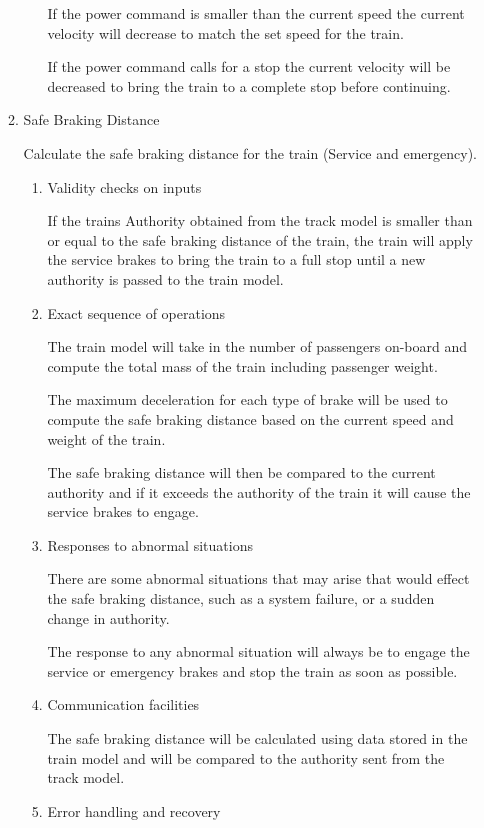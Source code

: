 \documentclass[11pt]{article}
\begin{document}
\begin{enumerate}
\begin{enumerate}
\begin{enumerate}
If the power command is smaller than the current speed the current velocity will decrease to match the set speed for the train.

If the power command calls for a stop the current velocity will be decreased to bring the train to a complete stop before continuing.
\end{enumerate}

\item Safe Braking Distance
\label{sec-3-1-4-1-3}

Calculate the safe braking distance for the train (Service and emergency). 
\begin{enumerate}
\item Validity checks on inputs
\label{sec-3-1-4-1-3-1}

If the trains Authority obtained from the track model is smaller than or equal to the safe braking distance of the train, the train will apply the service brakes to bring the train to a full stop until a new authority is passed to the train model.
\item Exact sequence of operations
\label{sec-3-1-4-1-3-2}

The train model will take in the number of passengers on-board and compute the total mass of the train including passenger weight. 

The maximum deceleration for each type of brake will be used to compute the safe braking distance based on the current speed and weight of the train.

The safe braking distance will then be compared to the current authority and if it exceeds the authority of the train it will cause the service brakes to engage. 
\item Responses to abnormal situations
\label{sec-3-1-4-1-3-3}

There are some abnormal situations that may arise that would effect the safe braking distance, such as a system failure, or a sudden change in authority. 

The response to any abnormal situation will always be to engage the service or emergency brakes and stop the train as soon as possible. 
\item Communication facilities
\label{sec-3-1-4-1-3-4}

The safe braking distance will be calculated using data stored in the train model and will be compared to the authority sent from the track model.
\item Error handling and recovery
\label{sec-3-1-4-1-3-5}


\end{enumerate}
\end{enumerate}
\end{enumerate}
\end{document}

